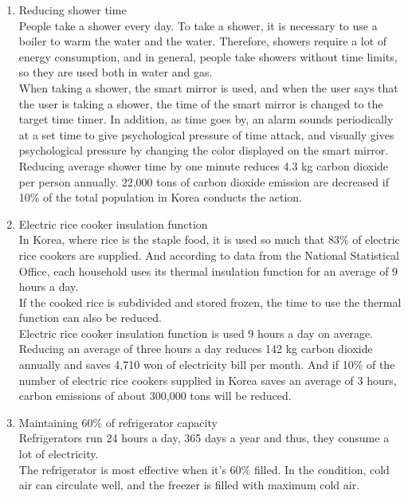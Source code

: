 \documentclass[11pt, conference]{IEEEtran}
\begin{document}
\begin{enumerate}[label=\arabic*]
    \begin{enumerate}[label=\alph*]
        \item Reducing shower time\\
        People take a shower every day. To take a shower, it is necessary to use a boiler to warm the water and the water. Therefore, showers require a lot of energy consumption, and in general, people take showers without time limits, so they are used both in water and gas.\\
        When taking a shower, the smart mirror is used, and when the user says that the user is taking a shower, the time of the smart mirror is changed to the target time timer. In addition, as time goes by, an alarm sounds periodically at a set time to give psychological pressure of time attack, and visually gives psychological pressure by changing the color displayed on the smart mirror. \\
        Reducing average shower time by one minute reduces 4.3 kg carbon dioxide per person annually. 22,000 tons of carbon dioxide emission are decreased if 10\% of the total population in Korea conducts the action.
        \item Electric rice cooker insulation function\\
        In Korea, where rice is the staple food, it is used so much that 83\% of electric rice cookers are supplied. And according to data from the National Statistical Office, each household uses its thermal insulation function for an average of 9 hours a day.\\
        If the cooked rice is subdivided and stored frozen, the time to use the thermal function can also be reduced.\\
        Electric rice cooker insulation function is used 9 hours a day on average. Reducing an average of three hours a day reduces 142 kg carbon dioxide annually and saves 4,710 won of electricity bill per month. And if 10\% of the number of electric rice cookers supplied in Korea saves an average of 3 hours, carbon emissions of about 300,000 tons will be reduced.
        \item Maintaining 60\% of refrigerator capacity\\
        Refrigerators run 24 hours a day, 365 days a year and thus, they consume a lot of electricity.\\
        The refrigerator is most effective when it’s 60\% filled. In the condition, cold air can circulate well, and the freezer is filled with maximum cold air.\\

\end{enumerate}
\end{enumerate}
\end{document}
